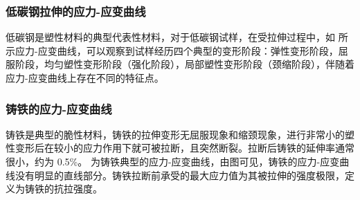 \documentclass[a4paper,utf8]{article}
\begin{document}
\subsubsection{低碳钢拉伸的应力-应变曲线}
低碳钢是塑性材料的典型代表性材料，对于低碳钢试样，在受拉伸过程中，如 所示应力-应变曲线，可以观察到试样经历四个典型的变形阶段：弹性变形阶段，屈服阶段，均匀塑性变形阶段（强化阶段），局部塑性变形阶段（颈缩阶段），伴随着应力-应变曲线上存在不同的特征点。
\begin{figure}[!ht]
    \begin{floatrow}\centering
    \end{floatrow}
\end{figure}
\subsubsection{铸铁的应力-应变曲线}
铸铁是典型的脆性材料，铸铁的拉伸变形无屈服现象和缩颈现象，进行非常小的塑性变形后在较小的应力作用下就可被拉断，且突然断裂。拉断后铸铁的延伸率通常很小，约为 0.5\%。 为铸铁典型的应力-应变曲线，由图可见，铸铁的应力-应变曲线没有明显的直线部分。铸铁拉断前承受的最大应力值为其被拉伸的强度极限，定义为铸铁的抗拉强度。
\end{document}
